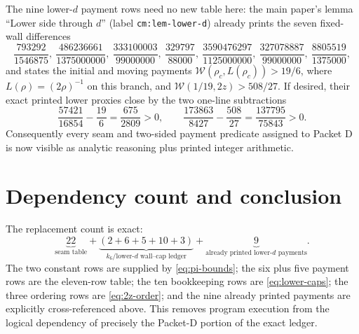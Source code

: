 \documentclass[11pt]{article}
\theoremstyle{remark}
\newcommand{\Weyl}{\mathcal W}
\begin{document}
The nine lower-$d$ payment rows need no new table here: the main paper's
lemma ``Lower side through $d$'' (label
\texttt{cm:lem-lower-d}) already prints the seven fixed-wall differences
\[
 \frac{793292}{1546875},\ 
 \frac{486236661}{1375000000},\ 
 \frac{333100003}{99000000},\ 
 \frac{329797}{88000},\ 
 \frac{3590476297}{1125000000},\ 
 \frac{327078887}{99000000},\ 
 \frac{8805519}{1375000},
\]
and states the initial and moving payments
$\Weyl(\rho_c,L(\rho_c))>19/6$, where
$L(\rho)=(2\rho)^{-1}$ on this branch, and
$\Weyl(1/19,2z)>508/27$.  If desired, their exact printed lower proxies close
by the two one-line subtractions
\begin{equation}
 \frac{57421}{16854}-\frac{19}{6}=\frac{675}{2809}>0,
 \qquad
 \frac{173863}{8427}-\frac{508}{27}
 =\frac{137795}{75843}>0.
 \label{eq:lower-d-last-two}
\end{equation}
Consequently every seam and two-sided payment predicate assigned to Packet
D is now visible as analytic reasoning plus printed integer arithmetic.

\section{Dependency count and conclusion}

The replacement count is exact:
\[
 \underbrace{22}_{\text{seam table}}
 +\underbrace{(2+6+5+10+3)}_{k_6/\text{lower-}d\text{ wall--cap ledger}}
 +\underbrace{9}_{\text{already printed lower-}d\text{ payments}}.
\]
The two constant rows are supplied by \eqref{eq:pi-bounds}; the six plus
five payment rows are the eleven-row table; the ten bookkeeping rows are
\eqref{eq:lower-caps}; the three ordering rows are
\eqref{eq:2z-order}; and the nine already printed payments are explicitly
cross-referenced above.  This removes program execution from the logical
dependency of precisely the Packet-D portion of the exact ledger.
\end{document}
